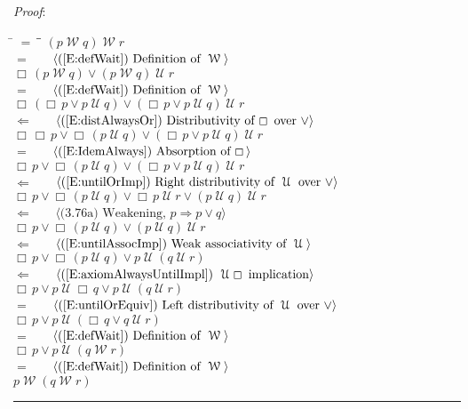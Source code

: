 \documentclass[12pt, fleqn, leqno]{article}
\newcommand{\lgap}{2pt}                             %
\newcommand{\mymathindent}{24pt}                    %
\newcommand{\impl}{\ensuremath{\Rightarrow}}        %
\newcommand{\foll}{\ensuremath{\Leftarrow}}         %
\newcommand{\Until}{\;\mathcal{U}\;}
\newcommand{\Wait}{\;\mathcal{W}\;}
\newcommand{\Always}{\Box\,}
\newcommand{\myqed}{\rule[-.23ex]{1.2ex}{2.0ex}}
\newcommand{\myqedtab}{\hspace{384pt}}              %
\newcommand{\Gll} {\langle}                         %
\newcommand{\Ggg} {\rangle}                         %
\newcommand{\Hint}[1]     {\ \ \ $\Gll              \mbox{#1} \Ggg$ }   %
\begin{document}
\emph{Proof}:
\begin{tabbing}
\hspace{\mymathindent} \= $= \;$ \= \myqedtab \= \kill
\> \> $(p \Wait q) \Wait r$\\[\lgap]
\> $=$ \> \Hint{(\ref{E:defWait}) Definition of $\Wait$} \\[\lgap]
\> \> $\Always (p \Wait q) \lor (p\Wait q)\Until r$\\[\lgap]
\> $=$ \> \Hint{(\ref{E:defWait}) Definition of $\Wait$} \\[\lgap]
\> \> $\Always (\Always p\lor p\Until q) \lor (\Always p\lor p\Until q)\Until r$\\[\lgap]
\> $\foll$  \>  \Hint{(\ref{E:distAlwaysOr}) Distributivity of $\Always$ over $\lor$}\\[\lgap]
\> \> $\Always\Always p\lor \Always (p\Until q) \lor (\Always p\lor p\Until q)\Until r$\\[\lgap]
\> $=$  \>  \Hint{(\ref{E:IdemAlways}) Absorption of $\Always$}\\[\lgap]
\> \> $\Always p\lor \Always (p\Until q) \lor (\Always p\lor p\Until q)\Until r$\\[\lgap]
\> $\foll$ \> \Hint{(\ref{E:untilOrImp}) Right distributivity of $\Until$ over $\lor$} \\[\lgap]
\> \> $\Always p\lor \Always (p\Until q) \lor \Always p\Until r\lor (p\Until q)\Until r$\\[\lgap]
\> $\foll$ \> \Hint{(3.76a) Weakening, $p\impl p\lor q$} \\[\lgap]
\> \> $\Always p\lor \Always (p\Until q) \lor (p\Until q)\Until r$\\[\lgap]
\> $\foll$ \>  \Hint{(\ref{E:untilAssocImp}) Weak associativity of $\Until$}\\[\lgap]
\> \> $\Always p\lor \Always (p\Until q) \lor p\Until (q\Until r)$\\[\lgap]
\> $\foll$ \> \Hint{(\ref{E:axiomAlwaysUntilImpl}) $\Until\Always$ implication}\\[\lgap]
\> \> $\Always p\lor p\Until \Always q \lor p\Until (q\Until r)$\\[\lgap]
\> $=$ \> \Hint{(\ref{E:untilOrEquiv}) Left distributivity of $\Until$ over $\lor$}\\[\lgap]
\> \> $\Always p\lor p\Until (\Always q \lor q\Until r)$\\[\lgap]
\> $=$ \> \Hint{(\ref{E:defWait}) Definition of $\Wait$} \\[\lgap]
\> \> $\Always p\lor p\Until (q\Wait r)$\\[\lgap]
\> $=$ \> \Hint{(\ref{E:defWait}) Definition of $\Wait$} \\[\lgap]
\> \> $p \Wait (q \Wait r)$ \quad \myqed
\end{tabbing}
\end{document}
